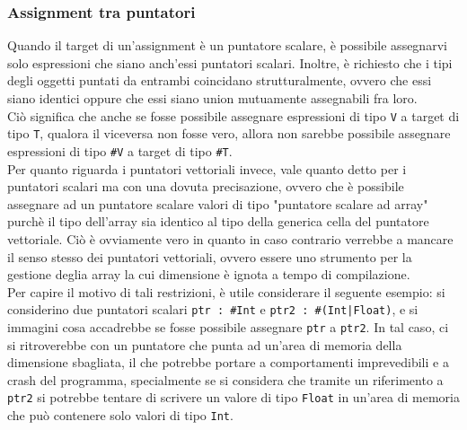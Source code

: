 \subsubsection{Assignment tra puntatori}
Quando il target di un'assignment è un puntatore scalare, è possibile assegnarvi solo 
espressioni che siano anch'essi puntatori scalari. Inoltre, è richiesto che i tipi degli oggetti puntati
da entrambi coincidano strutturalmente, ovvero che essi siano identici 
oppure che essi siano union mutuamente assegnabili fra loro. \\  

Ciò significa che anche se fosse possibile assegnare
espressioni di tipo \texttt{V} a target di tipo \texttt{T}, qualora il viceversa non fosse vero, 
allora non sarebbe possibile assegnare espressioni di tipo \texttt{\#V} a target di tipo \texttt{\#T}. \\

Per quanto riguarda i puntatori vettoriali invece, vale quanto detto per i puntatori scalari 
ma con una dovuta precisazione, ovvero che è possibile assegnare ad un puntatore scalare 
valori di tipo "puntatore scalare ad array" purchè il tipo dell'array sia identico al tipo 
della generica cella del puntatore vettoriale. Ciò è ovviamente vero in quanto in caso contrario 
verrebbe a mancare il senso stesso dei puntatori vettoriali, ovvero essere uno strumento per la 
gestione deglia array la cui dimensione è ignota a tempo di compilazione. \\

Per capire il motivo di tali restrizioni, è utile considerare il seguente esempio: si considerino
due puntatori scalari \texttt{ptr : \#Int} e \texttt{ptr2 : \#(Int|Float)}, e si immagini cosa 
accadrebbe se fosse possibile assegnare \texttt{ptr} a \texttt{ptr2}. In tal caso, ci si ritroverebbe
con un puntatore che punta ad un'area di memoria della dimensione sbagliata, il che potrebbe portare
a comportamenti imprevedibili e a crash del programma, specialmente se si considera che tramite  un 
riferimento a \texttt{ptr2} si potrebbe tentare di scrivere un valore di tipo \texttt{Float} in un'area
di memoria che può contenere solo valori di tipo \texttt{Int}. \\